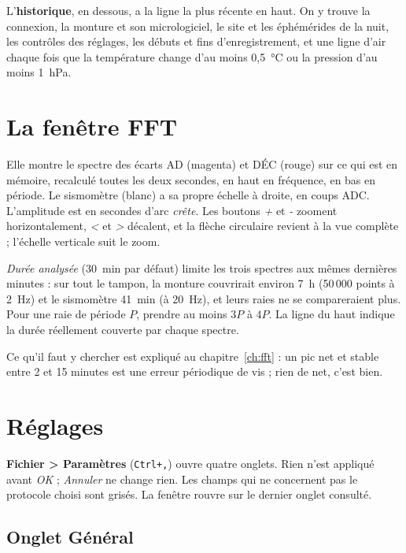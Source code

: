 L'\textbf{historique}, en dessous, a la ligne la plus récente en haut. On y
trouve la connexion, la monture et son micrologiciel, le site et les
éphémérides de la nuit, les contrôles des réglages, les débuts et fins
d'enregistrement, et une ligne d'air chaque fois que la température change d'au
moins 0,5~°C ou la pression d'au moins 1~hPa.

\chapter{La fenêtre FFT}
\label{ch:fftwin}


Elle montre le spectre des écarts AD (magenta) et DÉC (rouge) sur ce qui est
en mémoire, recalculé toutes les deux secondes, en haut en fréquence, en bas en
période. Le sismomètre (blanc) a sa propre échelle à droite, en coups ADC.
L'amplitude est en secondes d'arc \emph{crête}. Les boutons \emph{+} et
\emph{-} zooment horizontalement, \emph{<} et \emph{>} décalent, et la flèche
circulaire revient à la vue complète ; l'échelle verticale suit le zoom.

\emph{Durée analysée} (30~min par défaut) limite les trois spectres aux mêmes
dernières minutes : sur tout le tampon, la monture couvrirait environ 7~h
(50\,000 points à 2~Hz) et le sismomètre 41~min (à 20~Hz), et leurs raies ne se
compareraient plus. Pour une raie de période $P$, prendre au moins $3P$ à $4P$.
La ligne du haut indique la durée réellement couverte par chaque spectre.

Ce qu'il faut y chercher est expliqué au chapitre~\ref{ch:fft} : un pic net et
stable entre 2 et 15 minutes est une erreur périodique de vis ; rien de net,
c'est bien.

\chapter{Réglages}
\label{ch:config}

\textbf{Fichier > Paramètres} (\texttt{Ctrl+,}) ouvre quatre onglets. Rien
n'est appliqué avant \emph{OK} ; \emph{Annuler} ne change rien. Les champs qui
ne concernent pas le protocole choisi sont grisés. La fenêtre rouvre sur le
dernier onglet consulté.

\needspace{0.6\textheight}
\section{Onglet Général}
\label{sec:conn}

